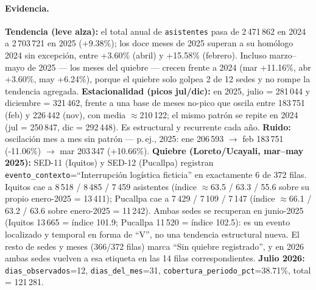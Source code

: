 \paragraph{Evidencia.}
\textbf{Tendencia (leve alza):} el total anual de \texttt{asistentes} pasa de 2\,471\,862 en 2024 a 2\,703\,721 en 2025 (+9.38\%); los doce meses de 2025 superan a su homólogo 2024 sin excepción, entre +3.60\% (abril) y +15.58\% (febrero). Incluso marzo--mayo de 2025 --- los meses del quiebre --- crecen frente a 2024 (mar +11.16\%, abr +3.60\%, may +6.24\%), porque el quiebre solo golpea 2 de 12 sedes y no rompe la tendencia agregada.
\textbf{Estacionalidad (picos jul/dic):} en 2025, julio = 281\,044 y diciembre = 321\,462, frente a una base de meses no-pico que oscila entre 183\,751 (feb) y 226\,442 (nov), con media $\approx$210\,122; el mismo patrón se repite en 2024 (jul = 250\,847, dic = 292\,448). Es estructural y recurrente cada año.
\textbf{Ruido:} oscilación mes a mes sin patrón --- p.\,ej., 2025: ene 206\,593 $\rightarrow$ feb 183\,751 (-11.06\%) $\rightarrow$ mar 203\,347 (+10.66\%).
\textbf{Quiebre (Loreto/Ucayali, mar--may 2025):} SED-11 (Iquitos) y SED-12 (Pucallpa) registran \texttt{evento\_contexto}=\enquote{Interrupción logística ficticia} en exactamente 6 de 372 filas. Iquitos cae a 8\,518 / 8\,485 / 7\,459 asistentes (índice $\approx$63.5 / 63.3 / 55.6 sobre su propio enero-2025 = 13\,411); Pucallpa cae a 7\,429 / 7\,109 / 7\,147 (índice $\approx$66.1 / 63.2 / 63.6 sobre enero-2025 = 11\,242). Ambas sedes se recuperan en junio-2025 (Iquitos 13\,665 = índice 101.9; Pucallpa 11\,520 = índice 102.5): es un evento localizado y temporal en forma de \enquote{V}, no una tendencia estructural nueva. El resto de sedes y meses (366/372 filas) marca \enquote{Sin quiebre registrado}, y en 2026 ambas sedes vuelven a esa etiqueta en las 14 filas correspondientes.
\textbf{Julio 2026:} \texttt{dias\_observados}=12, \texttt{dias\_del\_mes}=31, \texttt{cobertura\_periodo\_pct}=38.71\%, total = 121\,281.

